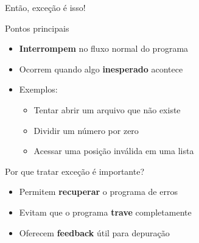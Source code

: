 \begin{frame}{Então, exceção é isso!}
    \begin{block}{Pontos principais}
        \begin{itemize}
            \item \textbf{Interrompem} no fluxo normal do programa
            \item Ocorrem quando algo \textbf{inesperado} acontece
            \item Exemplos:
                  \begin{itemize}
                      \item Tentar abrir um arquivo que não existe
                      \item Dividir um número por zero
                      \item Acessar uma posição inválida em uma lista
                  \end{itemize}
        \end{itemize}
    \end{block}

    \begin{exampleblock}{Por que tratar exceção é importante?}
        \begin{itemize}
            \item Permitem \textbf{recuperar} o programa de erros
            \item Evitam que o programa \textbf{trave} completamente
            \item Oferecem \textbf{feedback} útil para depuração
        \end{itemize}
    \end{exampleblock}


\end{frame}

